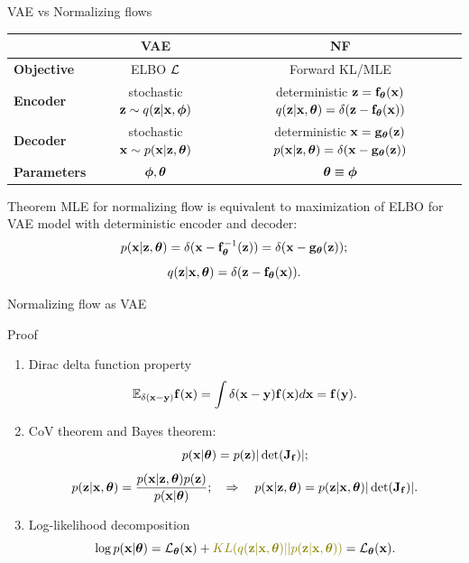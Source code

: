 \begin{frame}{VAE vs Normalizing flows}
	\begin{table}[]
		\begin{tabular}{l|c|c}
			& \textbf{VAE} & \textbf{NF} \\ \hline
			\textbf{Objective} & ELBO $\mathcal{L}$ & Forward KL/MLE \\ \hline
			\textbf{Encoder} & \shortstack{stochastic \\ $\mathbf{z} \sim q (\mathbf{z} | \mathbf{x}, \boldsymbol{\phi})$} &  \shortstack{\\ deterministic \\ $\mathbf{z} = \mathbf{f}_{\boldsymbol{\theta}}(\mathbf{x})$ \\ $q(\mathbf{z} | \mathbf{x}, \boldsymbol{\theta}) = \delta(\mathbf{z} - \mathbf{f}_{\boldsymbol{\theta}}(\mathbf{x}))$}  \\ \hline
			\textbf{Decoder} & \shortstack{stochastic \\ $\mathbf{x} \sim p (\mathbf{x} | \mathbf{z}, \boldsymbol{\theta})$} & \shortstack{\\ deterministic \\ $\mathbf{x} = \mathbf{g}_{\boldsymbol{\theta}}(\mathbf{z})$ \\ $ p(\mathbf{x} | \mathbf{z}, \boldsymbol{\theta}) = \delta(\mathbf{x} - \mathbf{g}_{\boldsymbol{\theta}}(\mathbf{z}))$} \\ \hline
			\textbf{Parameters}  & $\boldsymbol{\phi}, \boldsymbol{\theta}$ & $\boldsymbol{\theta} \equiv \boldsymbol{\phi}$\\ 
		\end{tabular}
	\end{table}
	\begin{block}{Theorem}
		MLE for normalizing flow is equivalent to maximization of ELBO for VAE model with deterministic encoder and decoder:
		\vspace{-0.3cm}
		\[
			p(\mathbf{x} | \mathbf{z}, \boldsymbol{\theta}) = \delta (\mathbf{x} - \mathbf{f}^{-1}_{\boldsymbol{\theta}}(\mathbf{z})) = \delta (\mathbf{x} - \mathbf{g}_{\boldsymbol{\theta}}(\mathbf{z}));
		\]
		\[
			q(\mathbf{z} | \mathbf{x}, \boldsymbol{\theta}) = \delta (\mathbf{z} - \mathbf{f}_{\boldsymbol{\theta}}(\mathbf{x})).
		\]
	\end{block}
\end{frame}
\begin{frame}{Normalizing flow as VAE}
	\begin{block}{Proof}
		\begin{enumerate}
			\item Dirac delta function property 
			\[
				\mathbb{E}_{\delta(\mathbf{x} - \mathbf{y})} \mathbf{f}(\mathbf{x}) = \int \delta(\mathbf{x} - \mathbf{y}) \mathbf{f}(\mathbf{x}) d \mathbf{x} = \mathbf{f}(\mathbf{y}).
			\]
			\item CoV theorem and Bayes theorem:
			\[
				p(\mathbf{x} | \boldsymbol{\theta}) = p(\mathbf{z}) |\det (\mathbf{J}_{\mathbf{f}})|;
			\]
			\[
				p(\mathbf{z} | \mathbf{x}, \boldsymbol{\theta}) = \frac{p(\mathbf{x} | \mathbf{z}, \boldsymbol{\theta}) p(\mathbf{z})}{p(\mathbf{x} | \boldsymbol{\theta})}; \quad \Rightarrow \quad p(\mathbf{x} | \mathbf{z}, \boldsymbol{\theta}) = p(\mathbf{z} | \mathbf{x}, \boldsymbol{\theta}) |\det (\mathbf{J}_{\mathbf{f}})|.
			\]
			\item Log-likelihood decomposition
			\[
				\log p(\bx | \btheta) = \cL_{\btheta}(\bx) + {\color{olive}KL(q(\bz | \bx, \btheta) || p(\bz | \bx, \btheta))} = \cL_{\btheta}(\bx).
			\]
		\end{enumerate}
	\end{block}
\end{frame}
